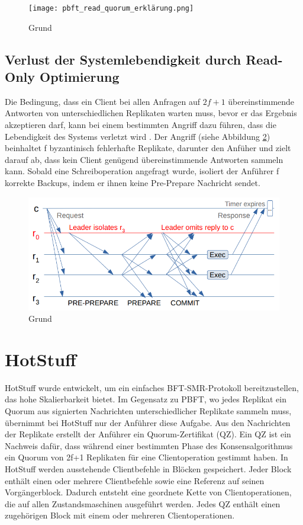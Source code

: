 \documentclass[nonacm,sigconf,natbib=false]{acmart}
\begin{document}
\begin{figure}[htbp]
  \centering
  \texttt{[image: pbft\_read\_quorum\_erklärung.png]}
  \caption{Grund}
  \label{fig:pbft-optimization}
\end{figure}

\subsection{Verlust der Systemlebendigkeit durch Read-Only Optimierung}

Die Bedingung, dass ein Client bei allen Anfragen auf $2f+1$ übereinstimmende Antworten von unterschiedlichen Replikaten warten muss, bevor er das Ergebnis akzeptieren darf, kann bei einem bestimmten Angriff dazu führen, dass die Lebendigkeit des Systems verletzt wird \cite{pbft-liveness-problem}. Der Angriff (siehe Abbildung \ref{fig:read-only-problem}) beinhaltet f byzantinisch fehlerhafte Replikate, darunter den Anfüher und zielt darauf ab, dass kein Client genügend übereinstimmende Antworten sammeln kann. Sobald eine Schreiboperation angefragt wurde, isoliert der Anführer f korrekte Backups, indem er ihnen keine Pre-Prepare Nachricht sendet. 
 
\begin{figure}[htbp]
  \centering
  \includegraphics[width=\linewidth]{read-only-problem.png}
  \caption{Grund}
  \label{fig:read-only-problem}
\end{figure}

\section{HotStuff}

HotStuff\cite{hotstuff} wurde entwickelt, um ein einfaches BFT-SMR-Protokoll bereitzustellen, das hohe Skalierbarkeit bietet. Im Gegensatz zu PBFT, wo jedes Replikat ein Quorum aus signierten Nachrichten unterschiedlicher Replikate sammeln muss, übernimmt bei HotStuff nur der Anführer diese Aufgabe. Aus den Nachrichten der Replikate erstellt der Anführer ein Quorum-Zertifikat (QZ). Ein QZ ist ein Nachweis dafür, dass während einer bestimmten Phase des Konsensalgorithmus ein Quorum von 2f+1 Replikaten für eine Clientoperation gestimmt haben. In HotStuff werden ausstehende Clientbefehle in Blöcken gespeichert. Jeder Block enthält einen oder mehrere Clientbefehle sowie eine Referenz auf seinen Vorgängerblock. Dadurch entsteht eine geordnete Kette von Clientoperationen, die auf allen Zustandsmaschinen ausgeführt werden. Jedes QZ enthält einen zugehörigen Block mit einem oder mehreren Clientoperationen.
\end{document}
